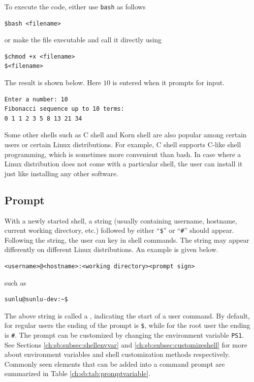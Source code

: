 To execute the code, either use \verb|bash| as follows
\begin{lstlisting}
$bash <filename>
\end{lstlisting}
or make the file executable and call it directly using
\begin{lstlisting}
$chmod +x <filename>
$<filename>
\end{lstlisting}
The result is shown below. Here $10$ is entered when it prompts for input.
\begin{lstlisting}
Enter a number: 10
Fibonacci sequence up to 10 terms:
0 1 1 2 3 5 8 13 21 34
\end{lstlisting}

Some other shells such as C shell and Korn shell are also popular among certain users or certain Linux distributions. For example, C shell supports C-like shell programming, which is sometimes more convenient than bash. In case where a Linux distribution does not come with a particular shell, the user can install it just like installing any other software.

\subsection{Prompt}

With a newly started shell, a string (usually containing username, hostname, current working directory, etc.) followed by either ``\verb|$|'' or ``\verb|#|'' should appear. Following the string, the user can key in shell commands. The string may appear differently on different Linux distributions. An example is given below.
\begin{lstlisting}
<username>@<hostname>:<working directory><prompt sign>
\end{lstlisting}
such as
\begin{lstlisting}
sunlu@sunlu-dev:~$
\end{lstlisting}

The above string is called a , indicating the start of a user command. By default, for regular users the ending of the prompt is \verb|$|, while for the root user the ending is \verb|#|. The prompt can be customized by changing the environment variable \verb|PS1|. See Sections \ref{ch:sb:subsec:shellenvvar} and \ref{ch:sb:subsec:customizeshell} for more about environment variables and shell customization methods respectively. Commonly seen elements that can be added into a command prompt are summarized in Table \ref{ch:sb:tab:promptvariable}.

